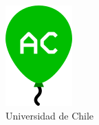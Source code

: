 \begin{titlepage}
	\begin{center}
		\includegraphics{logo.png} \\
		\Huge{Universidad de Chile}
	\end{center}
	\tableofcontents
\end{titlepage}
